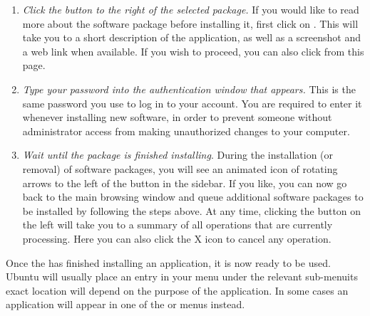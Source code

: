 \begin{enumerate}
	\item \emph{Click the  button to the right of the selected package.} If you would like to read more about the software package before installing it, first click on . This will take you to a short description of the application, as well as a screenshot and a web link when available. If you wish to proceed, you can also click  from this page.
   \item \emph{Type your password into the authentication window that appears.} This is the same password you use to log in to your account. You are required to enter it whenever installing new software, in order to prevent someone without administrator access from making unauthorized changes to your computer.
  \item \emph{Wait until the package is finished installing}. During the installation (or removal) of software packages, you will see an animated icon of rotating arrows to the left of the  button in the sidebar. If you like, you can now go back to the main browsing window and queue additional software packages to be installed by following the steps above. At any time, clicking the  button on the left will take you to a summary of all operations that are currently processing. Here you can also click the \textsf{X} icon to cancel any operation. 
\end{enumerate}


Once the  has finished installing an application, it is now ready to be used. Ubuntu will usually place an entry in your  menu under the relevant sub-menu\dash its exact location will depend on the purpose of the application. In some cases an application will appear in one of the  or  menus instead.

